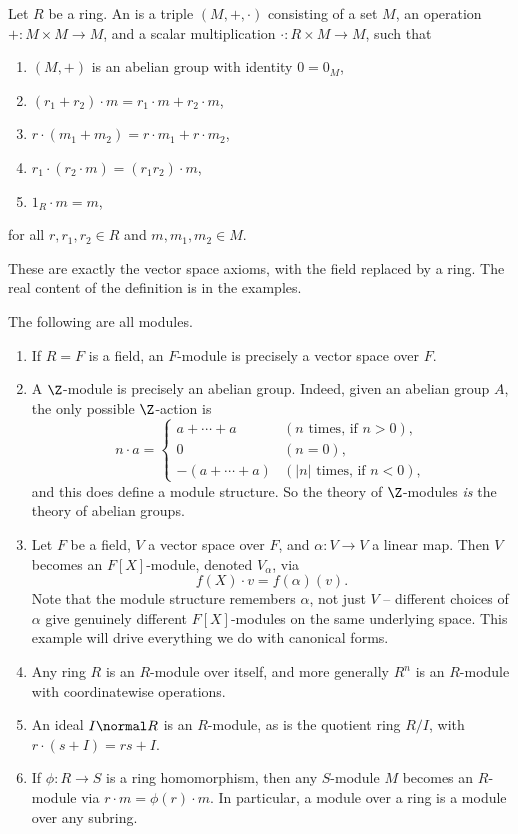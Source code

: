 \begin{definition}[Module]
	Let $R$ be a ring. An  is a triple $(M, +, \cdot)$ consisting of a set $M$, an operation $+ : M \times M \rightarrow M$, and a scalar multiplication $\cdot : R \times M \rightarrow M$, such that
	\begin{enumerate}[label=(\roman*)]
		\item $(M, +)$ is an abelian group with identity $0 = 0_M$,
		\item $(r_1 + r_2)\cdot m = r_1 \cdot m + r_2 \cdot m$,
		\item $r \cdot (m_1 + m_2) = r \cdot m_1 + r \cdot m_2$,
		\item $r_1 \cdot (r_2 \cdot m) = (r_1 r_2)\cdot m$,
		\item $1_R \cdot m = m$,
	\end{enumerate}
	for all $r, r_1, r_2 \in R$ and $m, m_1, m_2 \in M$.
\end{definition}

These are exactly the vector space axioms, with the field replaced by a ring. The real content of the definition is in the examples.

\begin{example}
	The following are all modules.
	\begin{enumerate}[label=(\roman*)]
		\item If $R = F$ is a field, an $F$-module is precisely a vector space over $F$.
		\item A $\Z$-module is precisely an abelian group. Indeed, given an abelian group $A$, the only possible $\Z$-action is
		$$
		n \cdot a = \begin{cases}
			a + \cdots + a & (n \text{ times, if } n > 0),\\
			0 & (n = 0), \\
			-(a + \cdots + a) & (|n| \text{ times, if } n < 0),
		\end{cases}
		$$
		and this does define a module structure. So the theory of $\Z$-modules \emph{is} the theory of abelian groups.
		\item Let $F$ be a field, $V$ a vector space over $F$, and $\alpha: V \rightarrow V$ a linear map. Then $V$ becomes an $F[X]$-module, denoted $V_{\alpha}$, via
		$$
		f(X) \cdot v = f(\alpha)(v).
		$$
		Note that the module structure remembers $\alpha$, not just $V$ -- different choices of $\alpha$ give genuinely different $F[X]$-modules on the same underlying space. This example will drive everything we do with canonical forms.
		\item Any ring $R$ is an $R$-module over itself, and more generally $R^n$ is an $R$-module with coordinatewise operations.
		\item An ideal $I \normal R$ is an $R$-module, as is the quotient ring $R/I$, with $r \cdot (s + I) = rs + I$.
		\item If $\phi : R \rightarrow S$ is a ring homomorphism, then any $S$-module $M$ becomes an $R$-module via $r \cdot m = \phi(r) \cdot m$. In particular, a module over a ring is a module over any subring.
	\end{enumerate}
\end{example}

